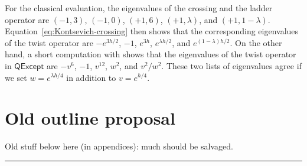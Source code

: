 \documentclass[12pt]{amsart}
\begin{document}
 For the classical
evaluation, the eigenvalues of the crossing and the ladder operator
are $(-1, 3)$, $(-1, 0)$, $(+1, 6)$, $(+1, \lambda)$, and
$(+1, 1-\lambda)$. Equation~\eqref{eq:Kontsevich-crossing} then shows
that the corresponding eigenvalues of the twist operator are
$-e^{3h/2}$, $-1$, $e^{3h}$, $e^{\lambda h/2}$, and
$e^{(1-\lambda)h/2}$. On the other hand, a short computation with
 shows that the eigenvalues of the twist
operator in $\mathsf{QExcept}$ are $-v^6$, $-1$, $v^{12}$, $w^2$, and
$v^2/w^2$. These two lists of eigenvalues agree if we set
$w = e^{\lambda h/4}$ in addition to $v = e^{h/4}$.



\appendix

\section{Old outline proposal}

Old stuff below here (in appendices): much should be salvaged.

\vspace{1cm}
\hrule
\vspace{1cm}
\end{document}
